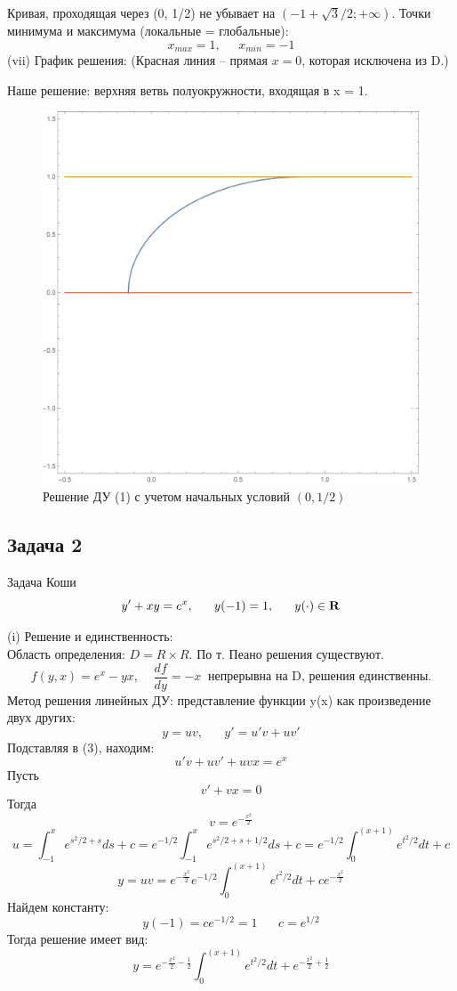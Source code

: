 \documentclass[a4paper, 12pt]{article}
\begin{document}
Кривая, проходящая через (0, 1/2) не убывает на  $(-1+ \sqrt{3}/2; +\infty)$.
Точки минимума и максимума (локальные = глобальные):
\[x_{max} = 1, \;\;\;\;\; x_{min}= -1\]
(vii) График решения:
(Красная линия -- прямая $x=0$, которая исключена из D.)




Наше решение: верхняя ветвь полуокружности, входящая в x = 1.

\begin{figure}[H]
	\centering
	\includegraphics[scale=0.47]{2.png}
	\caption{Решение ДУ (1) с учетом начальных условий $(0, 1/2)$}
\end{figure}




	\subsection {Задача 2}



Задача Коши 
\begin{equation}
y'+xy=e^x,\;\;\;\;\;\;y(-1) = 1, \;\;\;\;\;\;y(\cdot) \in \bf{R}
\end{equation}


(i) Решение и единственность:\\
Область определения: $D = R\times R$. По т. Пеано решения существуют. 
\[f(y, x) = e^x-yx, \;\;\;\; \frac{df}{dy} = - x\;\; \text{непрерывна на D, решения единственны.}\]
Метод решения линейных ДУ: представление функции y(x) как произведение двух других:
\[y=uv, \;\;\;\;\;\;y'=u'v+uv'\]
Подставляя в (3), находим:
\[u'v+uv'+uvx=e^x\]
Пусть
\[v'+vx=0\]
Тогда
\[v= e^{-\frac{x^2} 2}\]
\[u=\int_{-1}^x e^{s^2/2+s} ds+ c= e^{-1/2} \int_{-1}^{x} e^{s^2/2+s+1/2} ds+c = e^{-1/2}\int_0^{(x+1)} e^{t^2/2} dt+c\]
	\[y = uv = e^{-\frac{x^2} 2}  e^{-1/2}\int_{0}^{(x+1)} e^{t^2/2} dt+ce^{-\frac{x^2} 2}\] 
Найдем константу:
\[y(-1)=ce^{-1/2}=1\;\;\;\;\;\; c = e^{1/2}\]
Тогда решение имеет вид:
\[y =e^{-\frac{x^2} 2- \frac 1 2 } \int_{0}^{(x+1)} e^{t^2/2} dt+e^{-\frac{x^2} 2 +\frac 1 2 }\] 
\end{document}
